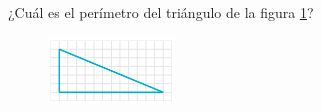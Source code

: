 
¿Cuál es el perímetro del triángulo de la figura \ref{fig:peri_rect_01}?
\begin{figure}[H]
    \begin{center}
        \includegraphics[width=0.3\textwidth]{../images/peri_rect_01.png}
    \end{center}
    \caption{}
    \label{fig:peri_rect_01}
\end{figure}